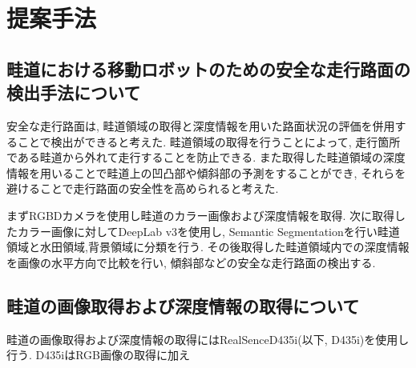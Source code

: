 \chapter{提案手法}\label{chap:method}



\section{畦道における移動ロボットのための安全な走行路面の検出手法について}
安全な走行路面は, 畦道領域の取得と深度情報を用いた路面状況の評価を併用することで検出ができると考えた. 
畦道領域の取得を行うことによって, 走行箇所である畦道から外れて走行することを防止できる. 
また取得した畦道領域の深度情報を用いることで畦道上の凹凸部や傾斜部の予測をすることができ, それらを避けることで走行路面の安全性を高められると考えた.

まずRGBDカメラを使用し畦道のカラー画像および深度情報を取得. 
次に取得したカラー画像に対してDeepLab v3\cite{chen2018encoder}を使用し, Semantic Segmentationを行い畦道領域と水田領域,背景領域に分類を行う. 
その後取得した畦道領域内での深度情報を画像の水平方向で比較を行い, 傾斜部などの安全な走行路面の検出する. 
\section{畦道の画像取得および深度情報の取得について}
畦道の画像取得および深度情報の取得にはRealSenceD435i(以下, D435i)を使用し行う. 
D435iはRGB画像の取得に加え





